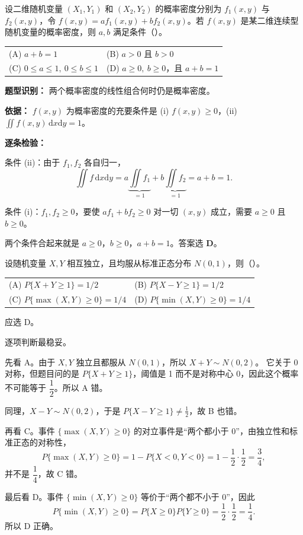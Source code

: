 ﻿\documentclass[lang=cn,11pt]{elegantbook}
\begin{document}
\begin{exercise}[密度函数线性组合] \label{exer:3-c1}
设二维随机变量 $(X_1,Y_1)$ 和 $(X_2,Y_2)$ 的概率密度分别为 $f_1(x,y)$ 与 $f_2(x,y)$，令 $f(x,y) = af_1(x,y) + bf_2(x,y)$。若 $f(x,y)$ 是某二维连续型随机变量的概率密度，则 $a, b$ 满足条件（\quad）。
\begin{tabular}{ll}
(A) $a+b=1$ & (B) $a>0$ 且 $b>0$ \\
(C) $0\leqslant a\leqslant 1,\ 0\leqslant b\leqslant 1$ & (D) $a\geqslant 0,\ b\geqslant 0$，且 $a+b=1$
\end{tabular}
\end{exercise}
\begin{solution}
\textbf{题型识别：} 两个概率密度的线性组合何时仍是概率密度。

\textbf{依据：} $f(x,y)$ 为概率密度的充要条件是 (i) $f(x,y) \geqslant 0$，(ii) $\displaystyle\iint f(x,y)\,\mathrm{d}x\mathrm{d}y = 1$。

\textbf{逐条检验：}

条件 (ii)：由于 $f_1, f_2$ 各自归一，
\[
\iint f\,\mathrm{d}x\mathrm{d}y = a\underbrace{\iint f_1}_{=1} + b\underbrace{\iint f_2}_{=1} = a + b = 1.
\]

条件 (i)：$f_1, f_2 \geqslant 0$，要使 $af_1 + bf_2 \geqslant 0$ 对一切 $(x,y)$ 成立，需要 $a \geqslant 0$ 且 $b \geqslant 0$。

两个条件合起来就是 $a \geqslant 0$，$b \geqslant 0$，$a + b = 1$。答案选 \textbf{D}。
\end{solution}

\begin{exercise}[标准正态独立随机变量] \label{exer:3-c2}
设随机变量 $X, Y$ 相互独立，且均服从标准正态分布 $N(0,1)$，则（\quad）。
\begin{tabular}{ll}
(A) $P\{X+Y \geqslant 1\} = 1/2$ & (B) $P\{X-Y \geqslant 1\} = 1/2$ \\
(C) $P\{\max(X,Y) \geqslant 0\} = 1/4$ & (D) $P\{\min(X,Y) \geqslant 0\} = 1/4$
\end{tabular}
\end{exercise}
\begin{solution}
应选 D。

逐项判断最稳妥。

先看 A。由于 \(X,Y\) 独立且都服从 \(N(0,1)\)，所以 \(X+Y\sim N(0,2)\)。
它关于 0 对称，但题目问的是 \(P\{X+Y\ge 1\}\)，阈值是 1 而不是对称中心 0，因此这个概率不可能等于 \(\dfrac12\)。所以 A 错。

同理，\(X-Y\sim N(0,2)\)，于是 \(P\{X-Y\ge 1\}\ne \frac12\)，故 B 也错。

再看 C。事件 \(\{\max(X,Y)\ge 0\}\) 的对立事件是“两个都小于 0”，由独立性和标准正态的对称性，
\[
P\{\max(X,Y)\ge 0\}=1-P\{X<0,Y<0\}=1-\frac12\cdot\frac12=\frac34,
\]
并不是 \(\dfrac14\)，故 C 错。

最后看 D。事件 \(\{\min(X,Y)\ge 0\}\) 等价于“两个都不小于 0”，因此
\[
P\{\min(X,Y)\ge 0\}=P\{X\ge 0\}P\{Y\ge 0\}
=\frac12\cdot\frac12
=\frac14.
\]
所以 D 正确。
\end{solution}
\end{document}
